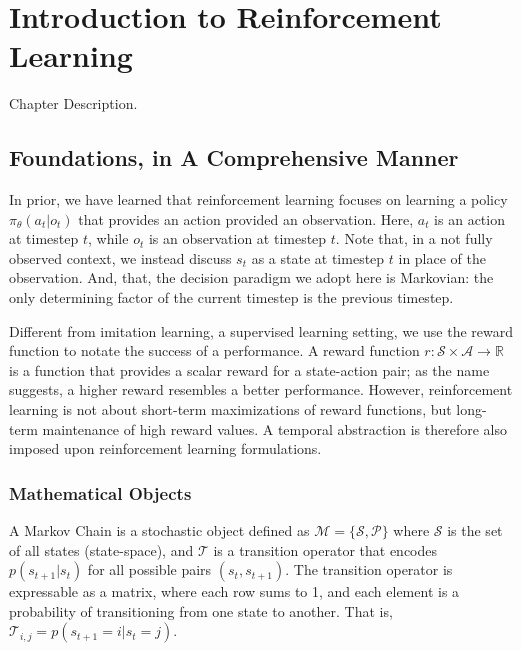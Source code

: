 \chapter{Introduction to Reinforcement Learning}
Chapter Description.

\section{Foundations, in A Comprehensive Manner}
In prior, we have learned that reinforcement learning focuses on learning a policy $\pi_\theta(a_t | o_t)$ that provides an action provided an observation.
Here, $a_t$ is an action at timestep $t$, while $o_t$ is an observation at timestep $t$.
Note that, in a not fully observed context, we instead discuss $s_t$ as a state at timestep $t$ in place of the observation.
And, that, the decision paradigm we adopt here is Markovian: the only determining factor of the current timestep is the previous timestep.

Different from imitation learning, a supervised learning setting, we use the reward function to notate the success of a performance.
A reward function $r : \mathcal{S} \times \mathcal{A} \to \mathbb{R}$ is a function that provides a scalar reward for a state-action pair; as the name suggests, a higher reward resembles a better performance.
However, reinforcement learning is not about short-term maximizations of reward functions, but long-term maintenance of high reward values.
A temporal abstraction is therefore also imposed upon reinforcement learning formulations.

\subsection{Mathematical Objects}
A Markov Chain is a stochastic object defined as $\mathcal{M} = \{\mathcal{S}, \mathcal{P}\}$ where $\mathcal{S}$ is the set of all states (state-space), and $\mathcal{T}$ is a transition operator that encodes $p(s_{t+1}|s_t)$ for all possible pairs $(s_t, s_{t+1})$.
The transition operator is expressable as a matrix, where each row sums to 1, and each element is a probability of transitioning from one state to another.
That is, $\mathcal{T}_{i,j} = p(s_{t+1}=i | s_t=j)$.

